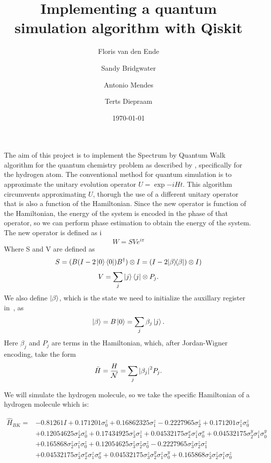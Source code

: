 \documentclass{article}
\title{Implementing a quantum simulation algorithm with Qiskit}
\author{Floris van den Ende\and Sandy Bridgwater\and Antonio Mendes\and Terts Diepraam}
\date{\today}
\def\kb#1#2{| #1 \rangle\!\langle #2 |}
\begin{document}
\maketitle

The aim of this project is to implement the Spectrum by Quantum Walk algorithm for the quantum chemistry problem as described by \textcite{poulin}, specifically for the hydrogen atom. The conventional method for quantum simulation is to approximate the unitary evolution operator $U = \exp{-iHt}$. This algorithm circumvents approximating $U$, thorugh the use of a different unitary operator that is also a function of the Hamiltonian. Since the new operator is function of the Hamiltonian, the energy of the system is encoded in the phase of that operator, so we can perform phase estimation to obtain the energy of the system. The new operator is defined as
i
\begin{equation} \label{W}
W = SV e^{i\pi}
\end{equation}
Where S and V are defined as
\[ S = (B (I - 2 \ket{0}\bra{0}) B^{\dagger}) \otimes I= (I-2\kb \beta \beta) \otimes I) \]
\[ V=\sum_{j}\ket{j}\bra{j} \otimes P_{j}. \]
We also define $\ket{\beta}$, which is the state we need to initialize the auxillary register in~\cite{poulin}, as
\[ \ket{\beta} = B \ket{0} = \sum_j \beta_j \ket{j}. \]
Here $\beta_j$ and $P_j$ are terms in the Hamiltonian, which, after Jordan-Wigner encoding, take the form
\begin{equation}
	\bar H = \frac H{\mathcal{N}} = \sum_j\abs{\beta_j}^2 P_j.
\end{equation}

We will simulate the hydrogen molecule, so we take the specific Hamiltonian of a hydrogen molecule which is:

\begin{align*}
\hat{H}_{B K}=&-0.81261 I+0.171201 \sigma_{0}^{z}+0.16862325 \sigma_{1}^{z}-0.2227965 \sigma_{2}^{z}+0.171201 \sigma_{1}^{z} \sigma_{0}^{z} \\
&+0.12054625 \sigma_{2}^{z} \sigma_{0}^{z}+0.17434925 \sigma_{3}^{z} \sigma_{1}^{z}+0.04532175 \sigma_{2}^{x} \sigma_{1}^{z} \sigma_{0}^{x}+0.04532175 \sigma_{2}^{y} \sigma_{1}^{z} \sigma_{0}^{y} \\
&+0.165868 \sigma_{2}^{z} \sigma_{1}^{z} \sigma_{0}^{z}+0.12054625 \sigma_{3}^{z} \sigma_{2}^{z} \sigma_{0}^{z}-0.2227965 \sigma_{3}^{z} \sigma_{2}^{z} \sigma_{1}^{z} \\
&+0.04532175 \sigma_{3}^{z} \sigma_{2}^{x} \sigma_{1}^{z} \sigma_{0}^{x}+0.04532175 \sigma_{3}^{z} \sigma_{2}^{y} \sigma_{1}^{z} \sigma_{0}^{y}+0.165868 \sigma_{3}^{z} \sigma_{2}^{z} \sigma_{1}^{z} \sigma_{0}^{z}
\end{align*}
\end{document}
